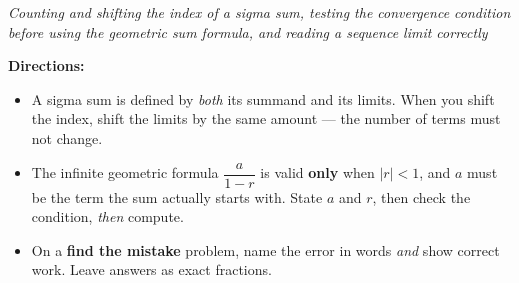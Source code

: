 \documentclass[12pt]{article}
\begin{document}

\begin{center}\small\textit{Counting and shifting the index of a sigma sum, testing the
convergence condition before using the geometric sum formula, and reading a sequence limit
correctly}\end{center}

\noindent\small\textbf{Directions:}
\begin{itemize}[label={$\bullet$}, leftmargin=1.1cm, itemsep=1pt, topsep=2pt]
  \item A sigma sum is defined by \emph{both} its summand and its limits. When you shift
        the index, shift the limits by the same amount --- the number of terms must not
        change.
  \item The infinite geometric formula $\dfrac{a}{1-r}$ is valid \textbf{only} when
        $|r| < 1$, and $a$ must be the term the sum actually starts with. State $a$ and
        $r$, then check the condition, \emph{then} compute.
  \item On a \textbf{find the mistake} problem, name the error in words \emph{and} show
        correct work. Leave answers as exact fractions.
\end{itemize}
\normalsize





\newpage

\end{document}
